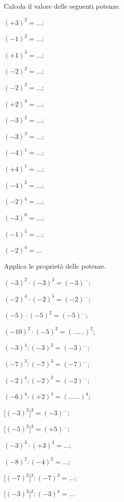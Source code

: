 \begin{esercizio}
\label{ese:2.21}
Calcola il valore delle seguenti potenze.
\begin{multicols}{3}
 \begin{enumeratea}
 \item $(+3)^2 = \ldots$;
 \item $(-1)^2 = \ldots$;
 \item $(+1)^3 = \ldots$;
 \item $(-2)^2 = \ldots$;
 \item $(-2)^3 = \ldots$;
 \item $(+2)^3 = \ldots$;
 \item $(-3)^2 = \ldots$;
 \item $(-3)^3 = \ldots$;
 \item $(-4)^1 = \ldots$;
 \item $(+4)^1 = \ldots$;
 \item $(-4)^2 = \ldots$;
 \item $(-2)^4 = \ldots$;
 \item $(-3)^0 = \ldots$;
 \item $(-1)^5 = \ldots$;
 \item $(-2)^4 = \ldots$
 \end{enumeratea}
 \end{multicols}
\end{esercizio}

\begin{esercizio}
\label{ese:2.22}
 Applica le proprietà delle potenze.
\begin{multicols}{2}
 \begin{enumeratea}
 \item $(-3)^2\cdot(-3)^3 = (-3)^{\ldots}$;
 \item $(-2)^4\cdot(-2)^5 = (-2)^{\ldots}$;
 \item $(-5)\cdot(-5)^2 = (-5)^{\ldots}$;
 \item $(-10)^2\cdot(-5)^2 = (\ldots \ldots)^2$;
 \item $(-3)^4:(-3)^2 = (-3)^{\ldots}$;
 \item $(-7)^3:(-7)^3=(-7)^{\ldots}$;
 \item $(-2)^4:(-2)^2=(-2)^{\ldots}$;
 \item $(-6)^4:(+2)^4=(\ldots \ldots)^4$;
 \item $\big[(-3)^2\big]^3 = (-3)^{\ldots}$;
 \item $\big[(-5)^2\big]^3=(+5)^{\ldots}$;
 \item $(-3)^3\cdot(+3)^3 = \ldots$;
 \item $(-8)^2:(-4)^2= \ldots$;
 \item $\big[(-7)^2\big]^3: (-7)^3 =\ldots$;
 \item $\big[(-3)^3\big]^2: (-3)^4=\ldots$
 \end{enumeratea}
 \end{multicols}
\end{esercizio}


